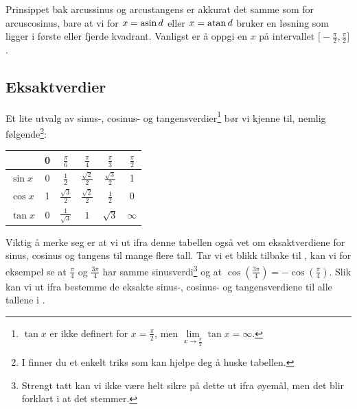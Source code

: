 Prinsippet bak arcussinus og arcustangens er akkurat det samme som for arcuscosinus, bare at vi for $ {x=\operatorname{asin} d}$ eller $ {x=\operatorname{atan} d }$ bruker en løsning som ligger i første eller fjerde kvadrant. Vanligst er å oppgi en $ x $ på intervallet $ {\Big[-\frac{\pi}{2}, \frac{\pi}{2}\Big]} $.
\newpage
{}
\subsection{Eksaktverdier \label{eksaktverdier}}
Et lite utvalg av sinus-, cosinus- og tangensverdier\footnote{$ \tan x $ er ikke definert for $ {x=\frac{\pi}{2}} $, men $ {\lim\limits_{x\to\frac{\pi}{2} }\tan x =\infty} $.} bør vi kjenne til, nemlig følgende\footnote{I  finner du et enkelt triks som kan hjelpe deg å huske tabellen.}:

{\centering		\renewcommand{\arraystretch}{1.5}	
		\begin{tabular}{l|c|c|c|c|c}
			& 0&$\frac{\pi}{6}$ & $\frac{\pi}{4}$ &$\frac{\pi}{3}$ & $\frac{\pi}{2}$    \\
			\hline
			$\sin x$ & 0 &$\frac{1}{2}$ & $\frac{\sqrt{2}}{2}$ & $\frac{\sqrt{3}}{2}$ & 1 \\
			$\cos x$ & 1 & $\frac{\sqrt{3}}{2}$ & $\frac{\sqrt{2}}{2}$ & $\frac{1}{2}$ & 0 \\
			$\tan x$ & 0 &$\frac{1}{\sqrt{3}}$ & $1$ & $\sqrt{3}$ & $ \infty  $
		\end{tabular}
} \vspace{12pt}
Viktig å merke seg er at vi ut ifra denne tabellen også vet om eksaktverdiene for sinus, cosinus og tangens til mange flere tall. Tar vi et blikk tilbake til , kan vi for eksempel se at $ \frac{\pi}{4} $ og $ \frac{3\pi}{4} $ har samme sinusverdi\footnote{Strengt tatt kan vi ikke være helt sikre på dette ut ifra øyemål, men det blir forklart i  at det stemmer.} og at $ {\cos \left(\frac{3\pi}{4}\right)=-\cos \left(\frac{\pi}{4}\right) }$. Slik kan vi ut ifra  bestemme de eksakte sinus-, cosinus- og tangensverdiene til alle tallene i .
\newpage

